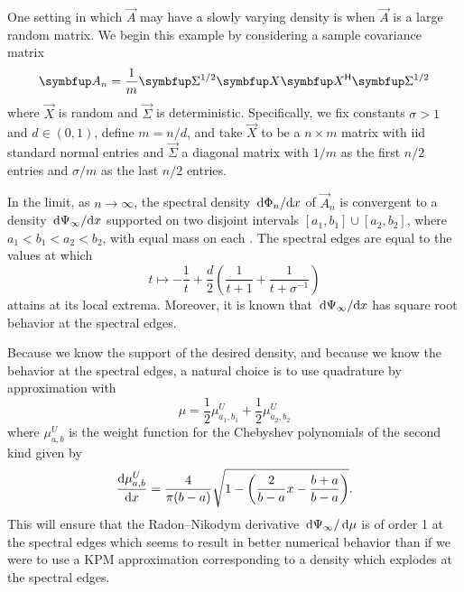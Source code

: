  
One setting in which \( \vec{A} \) may have a slowly varying density is when \( \vec{A} \) is a large random matrix. 
We begin this example by considering a sample covariance matrix
\begin{equation*}
    \vec{A}_n = \frac{1}{m} \vec{\Sigma}^{1/2} \vec{X} \vec{X}^\cT \vec{\Sigma}^{1/2}
\end{equation*}
where \( \vec{X} \) is random and \( \vec{\Sigma} \) is deterministic. 
Specifically, we fix constants \( \sigma > 1 \) and \( d \in (0,1) \), define \( m = n/d \), and take \( \vec{X} \) to be a \( n\times m \) matrix with iid standard normal entries and \( \vec{\Sigma} \) a diagonal matrix with \( 1/m \) as the first \( n/2 \) entries and \( \sigma/m \) as the last \( n/2 \) entries.

In the limit, as \( n\to\infty \), the spectral density \( \,\textup{d}\Phi_n /\textup{d} x \) of \( \vec{A}_n \) is convergent to a density \( \,\textup{d}\Psi_\infty/\textup{d} x \) supported on two disjoint intervals \( [a_1,b_1] \cup [a_2,b_2] \), where \( a_1 < b_1 < a_2 < b_2 \), with equal mass on each \cite{bai_silverstein_98}.
The spectral edges are equal to the values at which 
\begin{equation*}
    t\mapsto  -\frac{1}{t} + \frac{d}{2} \left( \frac{1}{t+1} + \frac{1}{t+\sigma^{-1}} \right)
\end{equation*}
attains at its local extrema.
Moreover, it is known that \( \,\textup{d}\Psi_\infty/\textup{d} x \) has square root behavior at the spectral edges.


Because we know the support of the desired density, and because we know the behavior at the spectral edges, a natural choice is to use quadrature by approximation with 
\begin{equation*}
    \mu 
    = \frac{1}{2}\mu_{a_1,b_1}^U + \frac{1}{2} \mu_{a_2,b_2}^U
\end{equation*}
where \( \mu_{a,b}^U \) is the weight function for the Chebyshev polynomials of the second kind given by
\begin{equation*}
    \frac{\textup{d}\mu_{a,b}^U}{\textup{d}{x}} 
    = \frac{4}{\pi (b-a)} \sqrt{1-\left( \frac{2}{b-a}x - \frac{b+a}{b-a}\right)} .
\end{equation*}
This will ensure that the Radon--Nikodym derivative \( \,\textup{d}\Psi_\infty / \,\textup{d}\mu \) is of order 1 at the spectral edges which seems to result in better numerical behavior than if we were to use a KPM approximation corresponding to a density which explodes at the spectral edges.


